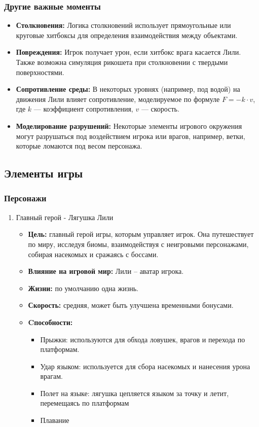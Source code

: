 \documentclass{article}
\begin{document}
\subsubsection{Другие важные моменты}
\begin{itemize}
    \item \textbf{Столкновения:} Логика столкновений использует прямоугольные или круговые хитбоксы для определения взаимодействия между объектами.
    \item \textbf{Повреждения:} Игрок получает урон, если хитбокс врага касается Лили. Также возможна симуляция рикошета при столкновении с твердыми поверхностями.
    \item \textbf{Сопротивление среды:} В некоторых уровнях (например, под водой) на движения Лили влияет сопротивление, моделируемое по формуле $F = -k \cdot v$, где $k$ — коэффициент сопротивления, $v$ — скорость.
    \item \textbf{Моделирование разрушений:} Некоторые элементы игрового окружения могут разрушаться под воздействием игрока или врагов, например, ветки, которые ломаются под весом персонажа.
\end{itemize}

\subsection{Элементы игры}
\subsubsection{Персонажи}

\begin{enumerate}
\item Главный герой - Лягушка Лили
    \begin{itemize}
     \item \textbf{Цель:} главный герой игры, которым управляет игрок. Она путешествует по миру, исследуя биомы, взаимодействуя с неигровыми персонажами, собирая насекомых и сражаясь с боссами.
     \item \textbf{Влияние на игровой мир:} Лили – аватар игрока.
     \item \textbf{Жизни:} по умолчанию одна жизнь.
     \item \textbf{Скорость:} средняя, может быть улучшена временными бонусами.
     \item \textbf{Cпособности:}
     \begin{itemize}
            \item Прыжки: используются для обхода ловушек, врагов и перехода по платформам.
            \item Удар языком: используется для сбора насекомых и нанесения урона врагам.
            \item Полет на языке: лягушка цепляется языком за точку и летит, перемещаясь по платформам
            \item Плавание
     \end {itemize}
     \end{itemize}
\end{enumerate}
\end{document}
